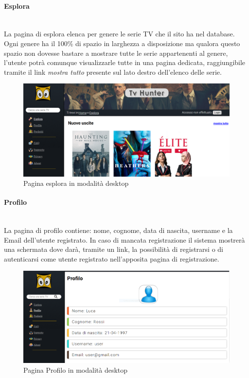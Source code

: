 \paragraph{Esplora}
~\\	
La pagina di esplora elenca per genere le serie TV che il sito ha nel database. Ogni genere ha il 100\% di spazio in larghezza a disposizione ma qualora questo spazio non dovesse bastare a mostrare tutte le serie appartenenti al genere, l'utente potrà comunque visualizzarle tutte in una pagina dedicata, raggiungibile tramite il link \textit{mostra tutto} presente sul lato destro dell'elenco delle serie.
\begin{figure}[H]
	\centerline{\includegraphics[scale=0.23]{img/esplora.png}}
	\caption{Pagina esplora in modalità desktop}
	\label{fig:addForm}
\end{figure}	

\paragraph{Profilo}
~\\
La pagina di profilo contiene: nome, cognome, data di nascita, username e la Email dell'utente registrato. In caso di mancata registrazione il sistema mostrerà una schermata dove darà, tramite un link, la possibilità di registrarsi o di autenticarsi come utente registrato nell'apposita pagina di registrazione. 
\begin{figure}[H]
	\centerline{\includegraphics[scale= 0.15]{img/profilo.png}}
	\caption{Pagina Profilo in modalità desktop}
\end{figure}





